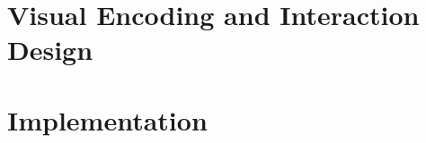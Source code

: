 \documentclass{vgtc}                          %
\begin{document}















\section{Visual Encoding and Interaction Design} %


\section{Implementation} %



\end{document}
